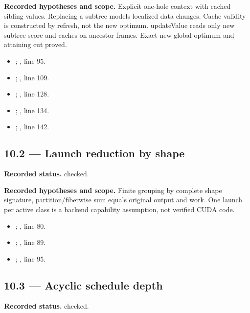\textbf{Recorded hypotheses and scope.} Explicit one-hole context with cached sibling values. Replacing a subtree models localized data changes. Cache validity is constructed by refresh, not the new optimum. updateValue reads only new subtree score and caches on ancestor frames. Exact new global optimum and attaining cut proved.

\begin{itemize}
\item {}; , line 95.
\item {}; , line 109.
\item {}; , line 128.
\item {}; , line 134.
\item {}; , line 142.
\end{itemize}
\subsection{10.2 — Launch reduction by shape}
\label{result:10.2}
\textbf{Recorded status.} checked.

\textbf{Recorded hypotheses and scope.} Finite grouping by complete shape signature, partition/fiberwise sum equals original output and work. One launch per active class is a backend capability assumption, not verified CUDA code.

\begin{itemize}
\item {}; , line 80.
\item {}; , line 89.
\item {}; , line 95.
\end{itemize}
\subsection{10.3 — Acyclic schedule depth}
\label{result:10.3}
\textbf{Recorded status.} checked.

